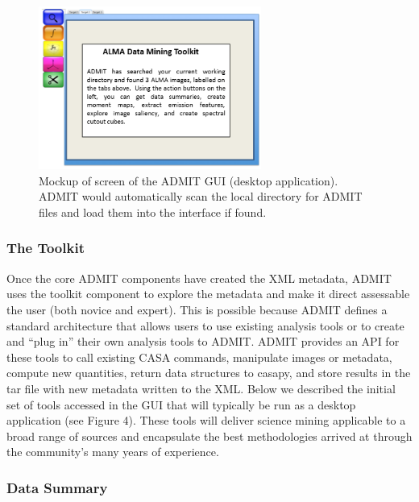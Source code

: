 \begin{figure}[t]
\centering
\includegraphics[width=0.65\textwidth]{search.png}
\hspace{0.03in}
\caption{\small \setlength{\baselineskip}{0.85\baselineskip}
Mockup of screen of the ADMIT GUI (desktop application).
ADMIT would automatically scan the local directory for
ADMIT files and load them into the interface if found.
  }
 \label{fig:layout2}
 \end{figure}

\subsubsection{The Toolkit}

Once the core ADMIT components have created the XML metadata, ADMIT uses 
the toolkit component to explore the metadata and make it direct assessable 
the user (both novice and expert).  This is possible because ADMIT defines a 
standard architecture that allows users to use existing analysis tools or to 
create and ``plug in'' their own analysis tools to ADMIT.  ADMIT provides an 
API for these tools to call existing CASA commands, manipulate images or metadata, 
compute new quantities, return data structures to casapy, and store results 
in the tar file with new metadata written to the XML.  Below we described the 
initial set of tools accessed in the GUI that will typically be run as a 
desktop application (see Figure 4).  These tools will deliver science mining 
applicable to a broad range of sources and encapsulate the best methodologies 
arrived at through the community’s many years of experience. 

\subsubsection{Data Summary}

